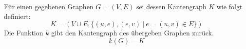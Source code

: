 \begin{mydef}[Kantengraph]\label{def:Kantengraph}
Für einen gegebenen Graphen $G=(V,E)$ sei dessen Kantengraph $K$ wie folgt 
definiert: 
\[
K=(V \cup E, \{(u,e),(e,v)\ |\ e=(u,v) \in E\})
\]
Die Funktion $k$ gibt den Kantengraph des übergeben Graphen zurück. 
\[ k(G)=K \]
\end{mydef}


